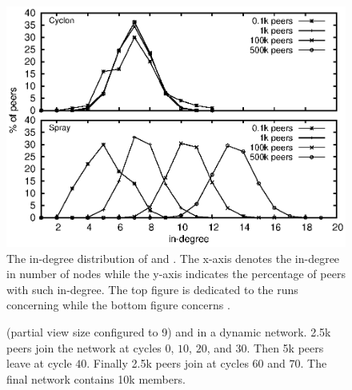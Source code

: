 \begin{figure}
  \centering
  \includegraphics[width=.8\textwidth]{img/spray/histo.eps}
  \caption{\label{fig:histo}The in-degree distribution of \CYCLON and
    \SPRAY. The x-axis denotes the in-degree in number of nodes while the
    y-axis indicates the percentage of peers with such in-degree. The top
    figure is dedicated to the runs concerning \CYCLON while the bottom figure
    concerns \SPRAY.}
\end{figure}

\begin{figure}
  \centering
  \hspace{10pt}
  \caption{\label{fig:churn}\CYCLON (partial view size configured to 9) and
    \SPRAY in a dynamic network. 2.5k peers join the network at cycles $0$,
    $10$, $20$, and $30$. Then 5k peers leave at cycle $40$. Finally 2.5k peers
    join at cycles $60$ and $70$. The final network contains 10k members.}
\end{figure}

